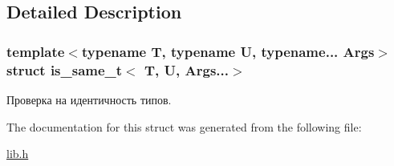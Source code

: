 \subsection{Detailed Description}
\subsubsection*{template$<$typename T, typename U, typename... Args$>$struct is\-\_\-same\-\_\-t$<$ T, U, Args...$>$}

Проверка на идентичность типов. 

The documentation for this struct was generated from the following file\-:\begin{DoxyCompactItemize}
\item 
\hyperlink{lib_8h}{lib.\-h}\end{DoxyCompactItemize}

